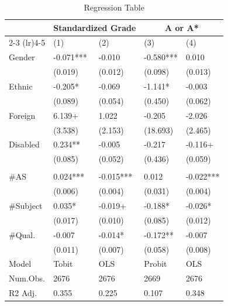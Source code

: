 \begin{table}[ht]
\centering
\caption{Regression Table} \label{tab:regression}
\begin{tabular}{lllll}
\toprule
\midrule
& \multicolumn{2}{c}{Standardized Grade} & \multicolumn{2}{c}{A or A*} \\
\cmidrule(lr){2-3} \cmidrule(lr){4-5} 
 & (1)       & (2)       & (3)     & (4)     \\
\midrule
Gender  & -0.071*** & -0.010   & -0.580*** & 0.010    \\
        & (0.019)   & (0.012)   & (0.098)   & (0.013)   \\
Ethnic  & -0.205*  & -0.069   & -1.141*  & -0.003   \\
        & (0.089)   & (0.054)   & (0.450)   & (0.062)   \\
Foreign & 6.139+   & 1.022    & -0.205   & -2.026   \\
        & (3.538)   & (2.153)   & (18.693) & (2.465)   \\
Disabled & 0.234**  & -0.005   & -0.217   & -0.116+  \\
         & (0.085)   & (0.052)   & (0.436)   & (0.059)   \\
\\
\#AS    & 0.024*** & -0.015*** & 0.012    & -0.022*** \\
        & (0.006)   & (0.004)   & (0.031)   & (0.004)   \\
\#Subject & 0.035*   & -0.019+  & -0.188*  & -0.026*  \\
          & (0.017)   & (0.010)   & (0.085)   & (0.012)   \\
\#Qual.  & -0.007   & -0.014*  & -0.172** & -0.007   \\
         & (0.011)   & (0.007)   & (0.058)   & (0.008)   \\
\midrule
Model   & Tobit    & OLS      & Probit   & OLS      \\
Num.Obs.& 2676     & 2676     & 2669     & 2676    \\
R2 Adj. & 0.355    & 0.225    & 0.107    & 0.348   \\
\bottomrule
\end{tabular}
\end{table}